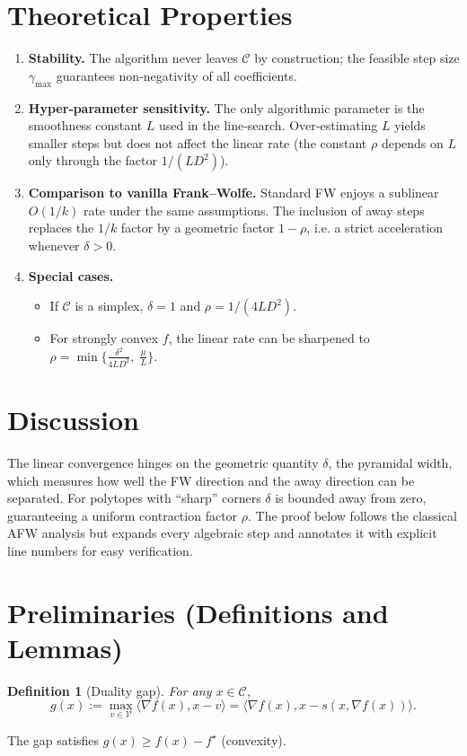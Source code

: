 \documentclass{article}
\newtheorem{definition}{Definition}
\begin{document}
\section*{Theoretical Properties}
\begin{enumerate}[label=\arabic*.]
\item \textbf{Stability.} The algorithm never leaves $\mathcal{C}$ by construction; the feasible step size $\gamma_{\max}$ guarantees non‑negativity of all coefficients.
\item \textbf{Hyper‑parameter sensitivity.} The only algorithmic parameter is the smoothness constant $L$ used in the line‑search. Over‑estimating $L$ yields smaller steps but does not affect the linear rate (the constant $\rho$ depends on $L$ only through the factor $1/(L D^{2})$).
\item \textbf{Comparison to vanilla Frank–Wolfe.} Standard FW enjoys a sublinear $O(1/k)$ rate under the same assumptions. The inclusion of away steps replaces the $1/k$ factor by a geometric factor $1-\rho$, i.e. a strict acceleration whenever $\delta>0$.
\item \textbf{Special cases.}
\begin{itemize}
\item If $\mathcal{C}$ is a simplex, $\delta=1$ and $\rho = 1/(4L D^{2})$.
\item For strongly convex $f$, the linear rate can be sharpened to $\rho = \min\bigl\{\frac{\delta^{2}}{4L D^{2}},\;\frac{\mu}{L}\bigr\}$.
\end{itemize}
\end{enumerate}

\section*{Discussion}
The linear convergence hinges on the geometric quantity $\delta$, the pyramidal width, which measures how well the FW direction and the away direction can be separated. For polytopes with ``sharp'' corners $\delta$ is bounded away from zero, guaranteeing a uniform contraction factor $\rho$. The proof below follows the classical AFW analysis but expands every algebraic step and annotates it with explicit line numbers for easy verification.

\newpage
\section*{Preliminaries (Definitions and Lemmas)}
\begin{definition}[Duality gap]
For any $x\in\mathcal{C}$,
\[
g(x):=\max_{v\in\mathcal{V}}\langle\nabla f(x),x-v\rangle
      =\langle\nabla f(x),x-s(x,\nabla f(x))\rangle .
\]
\end{definition}
The gap satisfies $g(x)\ge f(x)-f^{\star}$ (convexity).
\end{document}

